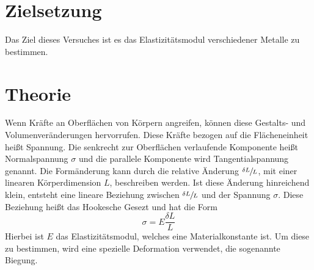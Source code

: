 \section{Zielsetzung}
Das Ziel dieses Versuches ist es das Elastizitätsmodul verschiedener Metalle zu bestimmen.

\section{Theorie}
\label{sec:Theorie}

Wenn Kräfte an Oberflächen von Körpern angreifen, können diese Gestalts- und Volumenveränderungen hervorrufen.
Diese Kräfte bezogen auf die Flächeneinheit heißt Spannung.
Die senkrecht zur Oberflächen verlaufende Komponente heißt Normalspannung $\sigma$ und die parallele Komponente wird Tangentialspannung genannt.
Die Formänderung kann durch die relative Änderung $\sfrac{\delta L }{L}$, mit einer linearen Körperdimension $L$, beschreiben werden.
Ist diese Änderung hinreichend klein, entsteht eine lineare Beziehung zwischen $\sfrac{\delta L }{L}$ und der Spannung $\sigma$.
Diese Beziehung heißt das Hookesche Gesezt und hat die Form
\begin{equation}
    \sigma = E \frac{\delta L}{L}
\end{equation}
Hierbei ist $E$ das Elastizitätsmodul, welches eine Materialkonstante ist.
Um diese zu bestimmen, wird eine spezielle Deformation verwendet, die sogenannte Biegung.
